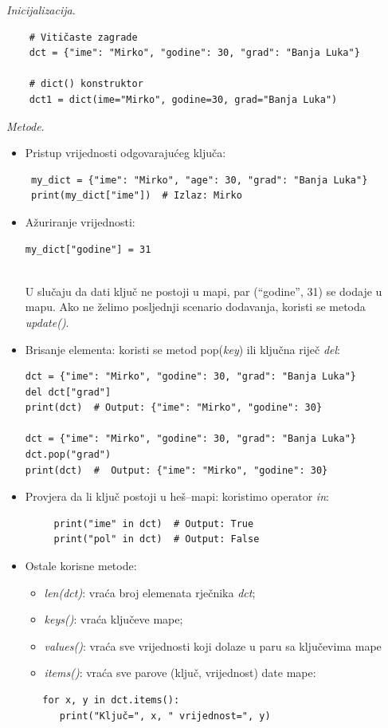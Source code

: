 \textit{Inicijalizacija}.  

\begin{verbatim}
	# Vitičaste zagrade
	dct = {"ime": "Mirko", "godine": 30, "grad": "Banja Luka"}
	
	# dict() konstruktor
	dct1 = dict(ime="Mirko", godine=30, grad="Banja Luka")
\end{verbatim}


\textit{Metode}. 
\begin{itemize}
	\item   Pristup vrijednosti odgovarajućeg ključa:
	
	\begin{verbatim}
 my_dict = {"ime": "Mirko", "age": 30, "grad": "Banja Luka"}
 print(my_dict["ime"])  # Izlaz: Mirko
	\end{verbatim}
	
     \item Ažuriranje vrijednosti:
     	
     \begin{verbatim}
my_dict["godine"] = 31
 
     \end{verbatim}
U slučaju da dati ključ ne postoji u mapi, par  (``godine'', 31) se dodaje u mapu.  Ako ne želimo posljednji scenario dodavanja, koristi se metoda \textit{update()}.
\item Brisanje elementa: koristi se metod pop(\textit{key}) ili ključna riječ \textit{del}:
 \begin{verbatim}
dct = {"ime": "Mirko", "godine": 30, "grad": "Banja Luka"}
del dct["grad"]
print(dct)  # Output: {"ime": "Mirko", "godine": 30}
	
dct = {"ime": "Mirko", "godine": 30, "grad": "Banja Luka"}
dct.pop("grad")
print(dct)  #  Output: {"ime": "Mirko", "godine": 30} 
\end{verbatim}

\item Provjera da li ključ postoji u heš--mapi: koristimo operator \textit{in}:
 \begin{verbatim}
     print("ime" in dct)  # Output: True
     print("pol" in dct)  # Output: False
 \end{verbatim}
\item Ostale korisne metode: 
\begin{itemize}
	\item \textit{len(dct)}: vraća broj elemenata rječnika \textit{dct};
	\item \textit{keys()}: vraća ključeve mape;
	\item \textit{values()}: vraća sve vrijednosti koji dolaze u paru sa ključevima mape
	\item \textit{items()}: vraća sve parove (ključ, vrijednost) date mape:
\end{itemize}
 \begin{verbatim}
   for x, y in dct.items():
      print("Ključ=", x, " vrijednost=", y)
 \end{verbatim}
\end{itemize}
